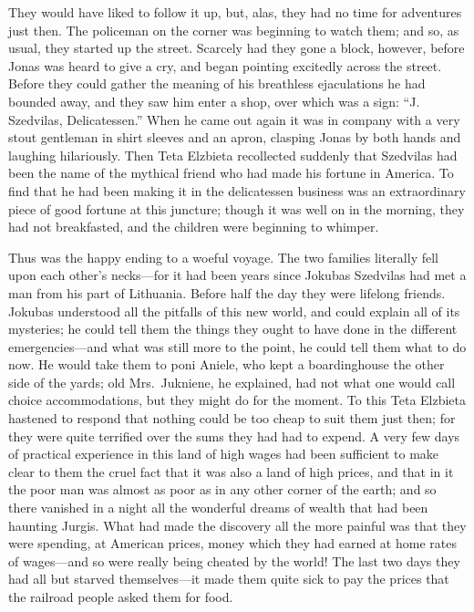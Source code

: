 \documentclass[
]{book}
\theoremstyle{definition}
\theoremstyle{definition}
\theoremstyle{definition}
\theoremstyle{definition}
\theoremstyle{remark}
\begin{document}
They would have liked to follow it up, but, alas, they had no time for adventures just then. The policeman on the corner was beginning to watch them; and so, as usual, they started up the street. Scarcely had they gone a block, however, before Jonas was heard to give a cry, and began pointing excitedly across the street. Before they could gather the meaning of his breathless ejaculations he had bounded away, and they saw him enter a shop, over which was a sign: ``J. Szedvilas, Delicatessen.'' When he came out again it was in company with a very stout gentleman in shirt sleeves and an apron, clasping Jonas by both hands and laughing hilariously. Then Teta Elzbieta recollected suddenly that Szedvilas had been the name of the mythical friend who had made his fortune in America. To find that he had been making it in the delicatessen business was an extraordinary piece of good fortune at this juncture; though it was well on in the morning, they had not breakfasted, and the children were beginning to whimper.

Thus was the happy ending to a woeful voyage. The two families literally fell upon each other's necks---for it had been years since Jokubas Szedvilas had met a man from his part of Lithuania. Before half the day they were lifelong friends. Jokubas understood all the pitfalls of this new world, and could explain all of its mysteries; he could tell them the things they ought to have done in the different emergencies---and what was still more to the point, he could tell them what to do now. He would take them to poni Aniele, who kept a boardinghouse the other side of the yards; old Mrs.~Jukniene, he explained, had not what one would call choice accommodations, but they might do for the moment. To this Teta Elzbieta hastened to respond that nothing could be too cheap to suit them just then; for they were quite terrified over the sums they had had to expend. A very few days of practical experience in this land of high wages had been sufficient to make clear to them the cruel fact that it was also a land of high prices, and that in it the poor man was almost as poor as in any other corner of the earth; and so there vanished in a night all the wonderful dreams of wealth that had been haunting Jurgis. What had made the discovery all the more painful was that they were spending, at American prices, money which they had earned at home rates of wages---and so were really being cheated by the world! The last two days they had all but starved themselves---it made them quite sick to pay the prices that the railroad people asked them for food.
\end{document}
